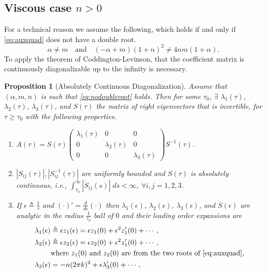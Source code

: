 \documentclass[a4paper,11pt]{article}
\newtheorem{proposition}{Proposition}[section]
\theoremstyle{remark}
\begin{document}
\subsection{Viscous case $n>0$}
For a technical reason we assume the following, which holds if and only if \eqref{eq:auxquad} does not have a double root.
 \begin{equation} 
  \alpha\ne m \quad \text{and} \quad (-\alpha+m)(1+n)^2 \ne 4nm(1+\alpha). \tag{$A0$} \label{eq:nodoubleroot} 
\end{equation}
To apply the theorem of Coddington-Levinson, that the coefficient matrix is continuously diagonalizable up to the infinity is necessary.
\begin{proposition}[Absolutely Continuous Diagonalization]
 Assume that $(\alpha,m,n)$ is such that \eqref{eq:nodoubleroot} holds. Then for some $\tau_0$, $\exists$ $\lambda_1(\tau)$, $\lambda_2(\tau)$, $\lambda_3(\tau)$, and $S(\tau)$ the matrix of right eigenvectors that is invertible, for $\tau\ge\tau_0$  with the following properties.
 \begin{enumerate}
  \item $A(\tau) = S(\tau) \begin{pmatrix} \lambda_1(\tau) & 0 & 0\\ 0 & \lambda_2(\tau) & 0 \\ 0 & 0 & \lambda_3(\tau) \end{pmatrix} S^{-1}(\tau)$.%
  \item $|S_{ij}(\tau)|, |S^{-1}_{ij}(\tau)|$ are uniformly bounded and $S(\tau)$ is absolutely continuous, i.e., $\int_{\tau_0}^\infty |\dot{S}_{ij}(s)|\; ds <\infty$, $\forall i,j=1,2,3$.
  \item If $\epsilon\triangleq \frac{1}{\tau}$ and $(\cdot)'=\frac{d}{d\epsilon}(\cdot)$ then $\lambda_1(\epsilon)$, $\lambda_2(\epsilon)$, $\lambda_3(\epsilon)$, and $S(\epsilon)$ are analytic in the radius $\frac{1}{\tau_0}$ ball of $0$ and their leading order expansions are
  \begin{align}
   \lambda_1(\epsilon) &\triangleq \epsilon z_1(\epsilon) = \epsilon z_1(0) + \epsilon^2 z_1'(0) + \cdots,\nonumber\\
   \lambda_2(\epsilon) &\triangleq \epsilon z_2(\epsilon) =\epsilon z_2(0) + \epsilon^2 z_1'(0) + \cdots,\nonumber\\ &\text{where $z_1(0)$ and $z_2(0)$ are from the two roots of \eqref{eq:auxquad},}\nonumber \\
   \lambda_3(\epsilon) &= -n(2\pi k)^2 + \epsilon\lambda_3'(0) + \cdots,\\

\end{align}
\end{enumerate}
\end{proposition}
\end{document}
